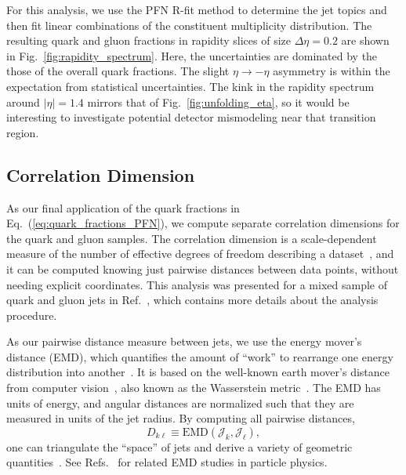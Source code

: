 \documentclass[aps,prd,twocolumn,preprintnumbers,nofootinbib,longbibliography,floatfix]{revtex4-1}
\DeclareRobustCommand{\Fig}[1]{Fig.~\ref{#1}}
\DeclareRobustCommand{\Eq}[1]{Eq.~(\ref{#1})}
\DeclareRobustCommand{\Ref}[1]{Ref.~\cite{#1}}
\DeclareRobustCommand{\Refs}[1]{Refs.~\cite{#1}}
\begin{document}
For this analysis, we use the PFN R-fit method to determine the jet topics and then fit linear combinations of the constituent multiplicity distribution.
%
The resulting quark and gluon fractions in rapidity slices of size $\Delta \eta = 0.2$ are shown in \Fig{fig:rapidity_spectrum}.
%
Here, the uncertainties are dominated by the those of the overall quark fractions.
%
The slight $\eta \to - \eta$ asymmetry is within the expectation from statistical uncertainties.
%
The kink in the rapidity spectrum around $|\eta| = 1.4$ mirrors that of \Fig{fig:unfolding_eta}, so it would be interesting to investigate potential detector mismodeling near that transition region.


\subsection{Correlation Dimension}
\label{sec:corrdim}




As our final application of the quark fractions in \Eq{eq:quark_fractions_PFN}, we compute separate correlation dimensions for the quark and gluon samples.
%
The correlation dimension is a scale-dependent measure of the number of effective degrees of freedom describing a dataset~\cite{Grassberger:1983zz,CAMASTRA20032945,NIPS2002_1177967c}, and it can be computed knowing just pairwise distances between data points, without needing explicit coordinates.
%
This analysis was presented for a mixed sample of quark and gluon jets in \Ref{Komiske:2019jim}, which contains more details about the analysis procedure.


As our pairwise distance measure between jets, we use the energy mover's distance (EMD), which quantifies the amount of ``work'' to rearrange one energy distribution into another~\cite{Komiske:2019fks}.
%
It is based on the well-known earth mover's distance from computer vision~\cite{DBLP:journals/pami/PelegWR89,Rubner:1998:MDA:938978.939133,Rubner:2000:EMD:365875.365881,DBLP:conf/eccv/PeleW08,DBLP:conf/gsi/PeleT13}, also known as the Wasserstein metric~\cite{wasserstein1969markov,dobrushin1970prescribing}.
%
The EMD has units of energy, and angular distances are normalized such that they are measured in units of the jet radius.
%
By computing all pairwise distances,
%
\begin{equation}
D_{k \ell} \equiv \text{EMD}(\mathcal{J}_k,\mathcal{J}_\ell),
\end{equation}
%
one can triangulate the ``space'' of jets and derive a variety of geometric quantities~\cite{Komiske:2020qhg}.
%
See \Refs{Cesarotti:2020hwb,CrispimRomao:2020ejk,Cai:2020vzx,Cai:2021hnn} for related EMD studies in particle physics.
\end{document}
